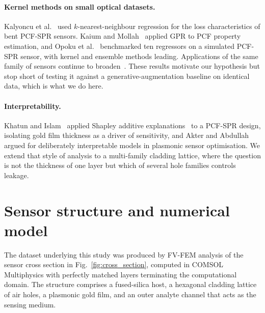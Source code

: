 \documentclass[iicol,pdflatex,sn-basic,Numbered]{sn-jnl}
\begin{document}
\paragraph{Kernel methods on small optical datasets.} Kalyoncu et
al.~\cite{kalyoncu2022} used $k$-nearest-neighbour regression for the loss
characteristics of bent PCF-SPR sensors. Kaium and Mollah~\cite{kaium2024} applied GPR to
PCF property estimation, and Opoku et al.~\cite{opoku2026} benchmarked ten
regressors on a simulated PCF-SPR sensor, with kernel and ensemble methods
leading. Applications of the same family of sensors continue to
broaden~\cite{shafi2026}. These results motivate our hypothesis but stop short of
testing it against a generative-augmentation baseline on identical data, which is
what we do here.

\paragraph{Interpretability.} Khatun and Islam~\cite{khatun2025} applied Shapley
additive explanations~\cite{lundberg2017} to a PCF-SPR design, isolating gold film
thickness as a driver of sensitivity, and Akter and Abdullah~\cite{akter2026}
argued for deliberately interpretable models in plasmonic sensor optimisation. We
extend that style of analysis to a multi-family cladding lattice, where the
question is not the thickness of one layer but which of several hole families
controls leakage.

\section{Sensor structure and numerical model}\label{sec:model}

The dataset underlying this study was produced by FV-FEM analysis of the sensor
cross section in Fig.~\ref{fig:cross_section}, computed in COMSOL Multiphysics
with perfectly matched layers terminating the computational domain. The structure
comprises a fused-silica host, a hexagonal cladding lattice of air holes, a
plasmonic gold film, and an outer analyte channel that acts as the sensing
medium.
\end{document}
